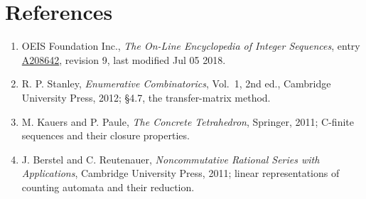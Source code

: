 \documentclass[11pt]{article}
\theoremstyle{definition}
\begin{document}
\section{References}

\begin{enumerate}

\item OEIS Foundation Inc., \emph{The On-Line Encyclopedia of Integer Sequences}, entry \href{https://oeis.org/A208642}{A208642}, revision 9, last modified Jul 05 2018.

\item R. P. Stanley, \emph{Enumerative Combinatorics}, Vol.~1, 2nd ed., Cambridge University Press, 2012; \S4.7, the transfer-matrix method.

\item M. Kauers and P. Paule, \emph{The Concrete Tetrahedron}, Springer, 2011; C-finite sequences and their closure properties.

\item J. Berstel and C. Reutenauer, \emph{Noncommutative Rational Series with Applications}, Cambridge University Press, 2011; linear representations of counting automata and their reduction.

\end{enumerate}
\end{document}
